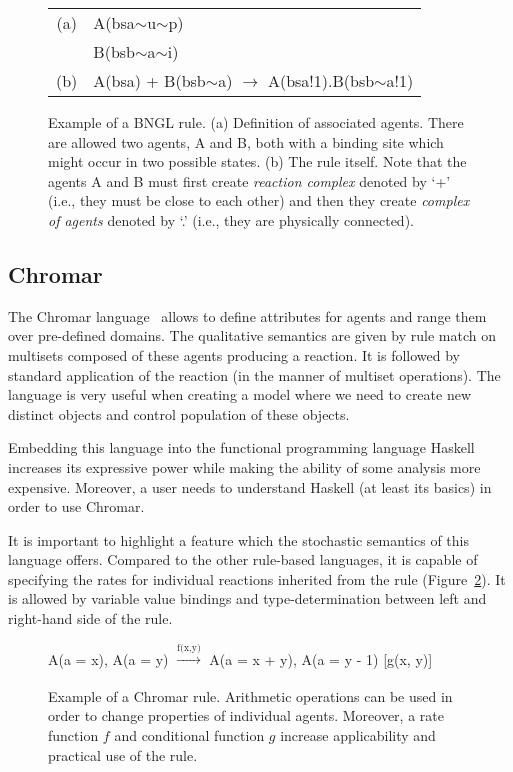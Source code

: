 \documentclass[11pt,a4paper]{report}
\begin{document}
\begin{figure}[!h]
\begin{center}
\begin{tabular}{c l}
(a) & A(bsa$\sim$u$\sim$p) \\
  & B(bsb$\sim$a$\sim$i) \\
(b) & A(bsa) + B(bsb$\sim$a) $\rightarrow$ A(bsa!1).B(bsb$\sim$a!1) \\
\end{tabular}
\end{center}
\caption{Example of a BNGL rule. (a) Definition of associated agents. There are allowed two agents, A and B, both with a binding site which might occur in two possible states. (b) The rule itself. Note that the agents A and B must first create \emph{reaction complex} denoted by `+' (i.e., they must be close to each other) and then they create \emph{complex of agents} denoted by `.' (i.e., they are physically connected).}\label{bngl-rule}
\end{figure}

\subsection{Chromar}

The Chromar language~\cite{honorato2017chromar} allows to define attributes for agents and range them over pre-defined domains. The qualitative semantics are given by rule match on multisets composed of these agents producing a reaction. It is followed by standard application of the reaction (in the manner of multiset operations). The language is very useful when creating a model where we need to create new distinct objects and control population of these objects.

Embedding this language into the functional programming language Haskell increases its expressive power while making the ability of some analysis more expensive. Moreover, a user needs to understand Haskell (at least its basics) in order to use Chromar.

It is important to highlight a feature which the stochastic semantics of this language offers. Compared to the other rule-based languages, it is capable of specifying the rates for individual reactions inherited from the rule (Figure~\ref{chromar_rule}). It is allowed by variable value bindings and type-determination between left and right-hand side of the rule.

\begin{figure}[!h]
\begin{center}
A(a = x), A(a = y) $\xrightarrow[]{\text{f(x,y)}}$ A(a = x + y), A(a = y - 1) [g(x, y)]
\end{center}
\caption{Example of a Chromar rule. Arithmetic operations can be used in order to change properties of individual agents. Moreover, a rate function $f$ and conditional function $g$ increase applicability and practical use of the rule.}\label{chromar-rule}\label{chromar_rule}
\end{figure}
\end{document}
